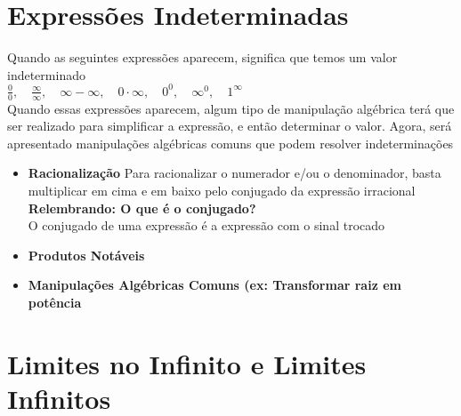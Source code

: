 \documentclass{article}
\begin{document}
\section{Expressões Indeterminadas}
Quando as seguintes expressões aparecem, significa que temos um valor indeterminado\\[10pt]
$\frac{0}{0},\quad \frac{\infty}{\infty},\quad \infty -\infty,\quad 0 \cdot \infty,\quad 0^{0},\quad \infty^{0}, \quad 1^{\infty}$
\\[10pt]
Quando essas expressões aparecem, algum tipo de manipulação algébrica terá que ser realizado para simplificar a expressão, e então determinar o valor. Agora, será apresentado manipulações algébricas comuns que podem resolver indeterminações
\begin{itemize}
    \item \textbf{Racionalização}
    Para racionalizar o numerador e/ou o denominador, basta multiplicar em cima e em baixo pelo conjugado da expressão irracional\\
    \textbf{Relembrando: O que é o conjugado?}\\
    O conjugado de uma expressão é a expressão com o sinal trocado
    \item \textbf{Produtos Notáveis}
    \item \textbf{Manipulações Algébricas Comuns (ex: Transformar raiz em potência}
\end{itemize}

\section{Limites no Infinito e Limites Infinitos}
\end{document}
